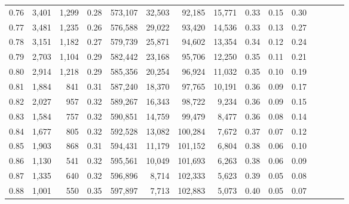 \begin{tabular}{rrrcrrrrrrrrrrr}
0.76 &   3,401 &  1,299 &                                       0.28 &  573,107 &   32,503 &   92,185 &   15,771 &  0.33 &  0.15 &                         0.30 \\
0.77 &   3,481 &  1,235 &                                       0.26 &  576,588 &   29,022 &   93,420 &   14,536 &  0.33 &  0.13 &                         0.27 \\
0.78 &   3,151 &  1,182 &                                       0.27 &  579,739 &   25,871 &   94,602 &   13,354 &  0.34 &  0.12 &                         0.24 \\
0.79 &   2,703 &  1,104 &                                       0.29 &  582,442 &   23,168 &   95,706 &   12,250 &  0.35 &  0.11 &                         0.21 \\
0.80 &   2,914 &  1,218 &                                       0.29 &  585,356 &   20,254 &   96,924 &   11,032 &  0.35 &  0.10 &                         0.19 \\
0.81 &   1,884 &    841 &                                       0.31 &  587,240 &   18,370 &   97,765 &   10,191 &  0.36 &  0.09 &                         0.17 \\
0.82 &   2,027 &    957 &                                       0.32 &  589,267 &   16,343 &   98,722 &    9,234 &  0.36 &  0.09 &                         0.15 \\
0.83 &   1,584 &    757 &                                       0.32 &  590,851 &   14,759 &   99,479 &    8,477 &  0.36 &  0.08 &                         0.14 \\
0.84 &   1,677 &    805 &                                       0.32 &  592,528 &   13,082 &  100,284 &    7,672 &  0.37 &  0.07 &                         0.12 \\
0.85 &   1,903 &    868 &                                       0.31 &  594,431 &   11,179 &  101,152 &    6,804 &  0.38 &  0.06 &                         0.10 \\
0.86 &   1,130 &    541 &                                       0.32 &  595,561 &   10,049 &  101,693 &    6,263 &  0.38 &  0.06 &                         0.09 \\
0.87 &   1,335 &    640 &                                       0.32 &  596,896 &    8,714 &  102,333 &    5,623 &  0.39 &  0.05 &                         0.08 \\
0.88 &   1,001 &    550 &                                       0.35 &  597,897 &    7,713 &  102,883 &    5,073 &  0.40 &  0.05 &                         0.07 \\

\end{tabular}
